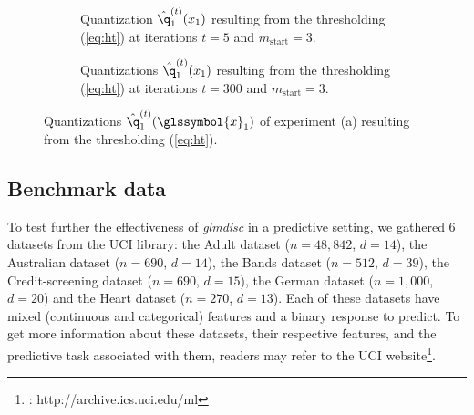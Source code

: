  \newlength\figureheight
 \newlength\figurewidth
 \setlength\figureheight{4cm}
 \setlength\figurewidth{14cm}
 
  \begin{figure}
    \centering
    \begin{subfigure}[t]{\textwidth}
        \centering
        
        \vspace{-0.5cm}
        \caption{Quantization $\hat{\q}^{(t)}_1(x_1)$ resulting from the thresholding (\ref{eq:ht}) at iterations $t = 5$ and $m_{\text{start}} = 3$.}
    \end{subfigure}%
    
    \begin{subfigure}[t]{\textwidth}
        \centering
        
        \vspace{-0.5cm}
        \caption{Quantizations $\hat{\q}^{(t)}_1(x_1)$ resulting from the thresholding (\ref{eq:ht}) at iterations $t = 300$ and $m_{\text{start}} = 3$.}
    \end{subfigure}
    
    \caption{\label{fig:MAP} Quantizations $\hat{\q}^{(t)}_1(\glssymbol{x}_1)$ of experiment (a) resulting from the thresholding (\ref{eq:ht}).}
\end{figure}

\subsection{Benchmark data}

To test further the effectiveness of \textit{glmdisc} in a predictive setting, we gathered 6 datasets from the UCI library: the Adult dataset ($n=48,842$, $d=14$), the Australian dataset ($n=690$, $d=14$), the Bands dataset ($n=512$, $d=39$), the Credit-screening dataset ($n=690$, $d=15$), the German dataset ($n=1,000$, $d=20$) and the Heart dataset ($n=270$, $d=13$). Each of these datasets have mixed (continuous and categorical) features and a binary response to predict. To get more information about these datasets, their respective features, and the predictive task associated with them, readers may refer to the UCI website\footnote{\cite{Dua:2017} : http://archive.ics.uci.edu/ml}.

